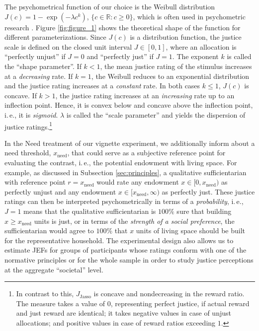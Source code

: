 \documentclass[12pt]{scrartcl}
\begin{document}
The psychometrical function of our choice is the Weibull distribution $J(c)=1-\exp(-\lambda c^k)$, $\{c\in\mathbb{R}:c\ge0\}$, which is often used in psychometric research \citep{wichmann_psychometric_2001,mortensen_additive_2002}.
Figure \ref{fig:figure_1} shows the theoretical shape of the function for different parameterizations.
Since $J(c)$ is a distribution function, the justice scale is defined on the closed unit interval $J\in[0,1]$, where an allocation is ``perfectly unjust'' if $J=0$ and ``perfectly just'' if $J=1$.
The exponent $k$ is called the ``shape parameter''.
If $k<1$, the mean justice rating of the stimulus increases at a \textit{decreasing} rate.
If $k=1$, the Weibull reduces to an exponential distribution and the justice rating increases at a \textit{constant} rate.
In both cases $k\le 1$, $J(c)$ is concave.
If $k>1$, the justice rating increases at an \textit{increasing} rate up to an inflection point.
Hence, it is convex below and concave above the inflection point, i.\,e., it is \textit{sigmoid}.
$\lambda$ is called the ``scale parameter'' and yields the dispersion of justice ratings.\footnote{In contrast to this, $J_\text{Jasso}$ is concave and nondecreasing in the reward ratio. The measure takes a value of $0$, representing perfect justice, if actual reward and just reward are identical; it takes negative values in case of unjust allocations; and positive values in case of reward ratios exceeding $1$.}

In the Need treatment of our vignette experiment, we additionally inform about a need threshold, $x_\text{need}$, that could serve as a subjective reference point for evaluating the contrast, i.\,e., the potential endowment with living space.
For example, as discussed in Subsection \ref{sec:principles}, a qualitative sufficientarian with reference point $r=x_\text{need}$ would rate any endowment $x\in[0,x_\text{need})$ as perfectly unjust and any endowment $x\in[x_\text{need},\infty)$ as perfectly just.
These justice ratings can then be interpreted psychometrically in terms of a \textit{probability}, i.\,e., $J=1$ means that the qualitative sufficientarian is $100\%$ sure that building $x\ge x_\text{need}$ units is just, or in terms of the \textit{strength of a social preference}, the sufficientarian would agree to $100\%$ that $x$ units of living space should be built for the representative household.
The experimental design also allows us to estimate JEFs for groups of participants whose ratings conform with one of the normative principles or for the whole sample in order to study justice perceptions at the aggregate ``societal'' level.
\end{document}
